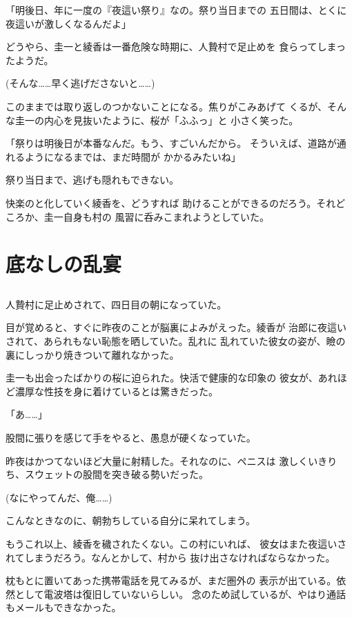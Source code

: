 ﻿\documentclass[
    book,tate,
    line_length=30zw,
    jafontsize=12pt,
    paper=b5j,
    landscape,
    ]{jlreq}
\begin{document}
「明後日、年に一度の『夜這い祭り』なの。祭り当日までの
五日間は、とくに夜這いが激しくなるんだよ」

どうやら、圭一と綾香は一番危険な時期に、人贄村で足止めを
食らってしまったようだ。

(そんな……早く逃げださないと……)

このままでは取り返しのつかないことになる。焦りがこみあげて
くるが、そんな圭一の内心を見抜いたように、桜が「ふふっ」と
小さく笑った。

「祭りは明後日が本番なんだ。もう、すごいんだから。
そういえば、道路が通れるようになるまでは、まだ時間が
かかるみたいね」

祭り当日まで、逃げも隠れもできない。

快楽のと化していく綾香を、どうすれば
助けることができるのだろう。それどころか、圭一自身も村の
風習に呑みこまれようとしていた。

\chapter{底なしの乱宴}

\section*{}

人贄村に足止めされて、四日目の朝になっていた。

目が覚めると、すぐに昨夜のことが脳裏によみがえった。綾香が
治郎に夜這いされて、あられもない恥態を晒していた。乱れに
乱れていた彼女の姿が、瞼の裏にしっかり焼きついて離れなかった。

圭一も出会ったばかりの桜に迫られた。快活で健康的な印象の
彼女が、あれほど濃厚な性技を身に着けているとは驚きだった。

「あ……」

股間に張りを感じて手をやると、愚息が硬くなっていた。

昨夜はかつてないほど大量に射精した。それなのに、ペニスは
激しくいきりち、スウェットの股間を突き破る勢いだった。

(なにやってんだ、俺……)

こんなときなのに、朝勃ちしている自分に呆れてしまう。

もうこれ以上、綾香を穢されたくない。この村にいれば、
彼女はまた夜這いされてしまうだろう。なんとかして、村から
抜け出さなければならなかった。

枕もとに置いてあった携帯電話を見てみるが、まだ圏外の
表示が出ている。依然として電波塔は復旧していないらしい。
念のため試しているが、やはり通話もメールもできなかった。
\end{document}
